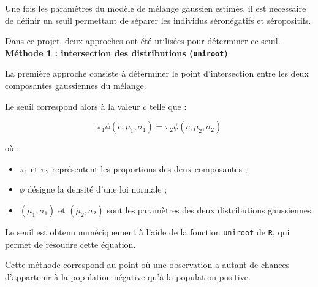 \documentclass[a4paper]{article}
\begin{document}
Une fois les paramètres du modèle de mélange gaussien estimés, il est nécessaire de définir un seuil permettant de séparer les individus séronégatifs et séropositifs.

Dans ce projet, deux approches ont été utilisées pour déterminer ce seuil. \\

\textbf{Méthode 1 : intersection des distributions (\texttt{uniroot})}

La première approche consiste à déterminer le point d’intersection entre les deux composantes gaussiennes du mélange.

Le seuil correspond alors à la valeur $c$ telle que :

\[
\pi_1 \phi(c ; \mu_1, \sigma_1)
=
\pi_2 \phi(c ; \mu_2, \sigma_2)
\]

où :
\begin{itemize}
    \item $\pi_1$ et $\pi_2$ représentent les proportions des deux composantes ;
    \item $\phi$ désigne la densité d’une loi normale ;
    \item $(\mu_1, \sigma_1)$ et $(\mu_2, \sigma_2)$ sont les paramètres des deux distributions gaussiennes.
\end{itemize}

Le seuil est obtenu numériquement à l’aide de la fonction \texttt{uniroot} de \texttt{R}, qui permet de résoudre cette équation.

Cette méthode correspond au point où une observation a autant de chances d’appartenir à la population négative qu’à la population positive. \\
\end{document}
